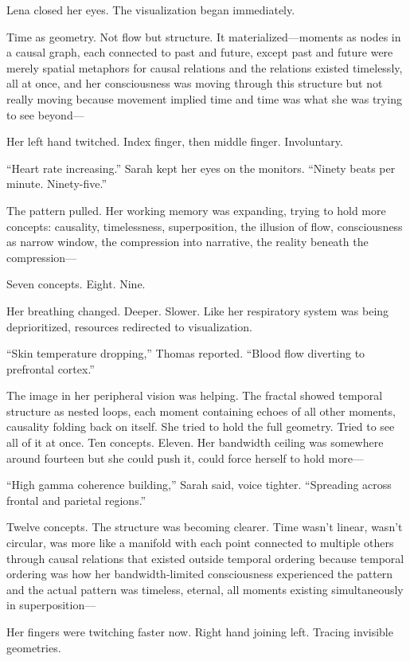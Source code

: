Lena closed her eyes. The visualization began immediately.

Time as geometry. Not flow but structure. It materialized—moments as nodes in a causal graph, each connected to past and future, except past and future were merely spatial metaphors for causal relations and the relations existed timelessly, all at once, and her consciousness was moving through this structure but not really moving because movement implied time and time was what she was trying to see beyond—

Her left hand twitched. Index finger, then middle finger. Involuntary.

``Heart rate increasing.'' Sarah kept her eyes on the monitors. ``Ninety beats per minute. Ninety-five.''

The pattern pulled. Her working memory was expanding, trying to hold more concepts: causality, timelessness, superposition, the illusion of flow, consciousness as narrow window, the compression into narrative, the reality beneath the compression—

Seven concepts. Eight. Nine.

Her breathing changed. Deeper. Slower. Like her respiratory system was being deprioritized, resources redirected to visualization.

``Skin temperature dropping,'' Thomas reported. ``Blood flow diverting to prefrontal cortex.''

The image in her peripheral vision was helping. The fractal showed temporal structure as nested loops, each moment containing echoes of all other moments, causality folding back on itself. She tried to hold the full geometry. Tried to see all of it at once. Ten concepts. Eleven. Her bandwidth ceiling was somewhere around fourteen but she could push it, could force herself to hold more—

``High gamma coherence building,'' Sarah said, voice tighter. ``Spreading across frontal and parietal regions.''

Twelve concepts. The structure was becoming clearer. Time wasn't linear, wasn't circular, was more like a manifold with each point connected to multiple others through causal relations that existed outside temporal ordering because temporal ordering was how her bandwidth-limited consciousness experienced the pattern and the actual pattern was timeless, eternal, all moments existing simultaneously in superposition—

Her fingers were twitching faster now. Right hand joining left. Tracing invisible geometries.

